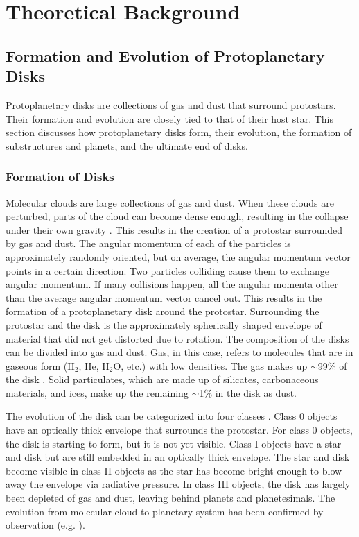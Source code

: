\documentclass[oneside, single, authoryear, semicolon, 12pt]{lion-msc}
\newcommand{\4}{$_4$}
\newcommand{\3}{$_3$}
\newcommand{\2}{$_2$}
\begin{document}
\chapter{Theoretical Background}\label{Ch: theory}
\section{Formation and Evolution of Protoplanetary Disks}
Protoplanetary disks are collections of gas and dust that surround protostars. Their formation and evolution are closely tied to that of their host star. This section discusses how protoplanetary disks form, their evolution, the formation of substructures and planets, and the ultimate end of disks. 

\subsection{Formation of Disks}
Molecular clouds are large collections of gas and dust. When these clouds are perturbed, parts of the cloud can become dense enough, resulting in the collapse under their own gravity \citep{1987ARA&A..25...23S}. This results in the creation of a protostar surrounded by gas and dust. The angular momentum of each of the particles is approximately randomly oriented, but on average, the angular momentum vector points in a certain direction. Two particles colliding cause them to exchange angular momentum. If many collisions happen, all the angular momenta other than the average angular momentum vector cancel out. This results in the formation of a protoplanetary disk around the protostar. Surrounding the protostar and the disk is the approximately spherically shaped envelope of material that did not get distorted due to rotation. The composition of the disks can be divided into gas and dust. Gas, in this case, refers to molecules that are in gaseous form (H\2, He, H\2O, etc.) with low densities. The gas makes up $\sim$99\% of the disk \citep{Diskcomp}. Solid particulates, which are made up of silicates, carbonaceous materials, and ices, make up the remaining $\sim$1\% in the disk as dust.

The evolution of the disk can be categorized into four classes \citep{1987ApJ...312..788A}. Class 0 objects have an optically thick envelope that surrounds the protostar. For class 0 objects, the disk is starting to form, but it is not yet visible. Class I objects have a star and disk but are still embedded in an optically thick envelope. The star and disk become visible in class II objects as the star has become bright enough to blow away the envelope via radiative pressure. In class III objects, the disk has largely been depleted of gas and dust, leaving behind planets and planetesimals. The evolution from molecular cloud to planetary system has been confirmed by observation (e.g. \cite{Furlan_2016, J_rgensen_2009}).
\end{document}
